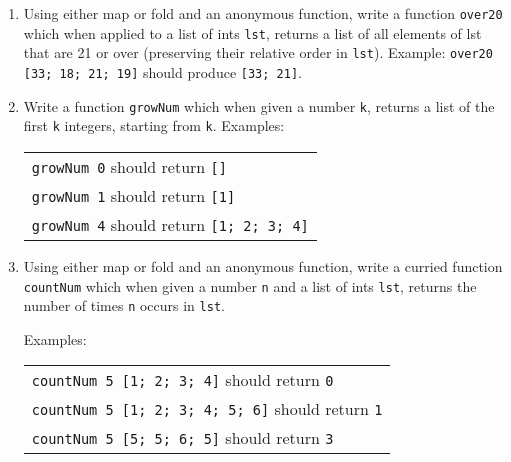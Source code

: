 \documentclass[11pt]{article}
\begin{document}
\begin{enumerate}
\begin{enumerate}
            \item Using either map or fold and an anonymous function, write
                  a function \texttt{over20} which when applied to a list of
                  ints \texttt{lst}, returns a list of all elements of lst
                  that are 21 or over (preserving their relative order in
                  \texttt{lst}).  Example: \texttt{over20 [33; 18; 21; 19]}
                  should produce \texttt{[33; 21]}.

            \item Write a function \texttt{growNum} which when given a
                  number \texttt{k}, returns a list of the first \texttt{k}
                  integers, starting from \texttt{k}.  Examples:

                  \begin{tabular}[t]{l}

                    \texttt{growNum 0} should return \texttt{[]}
                      \\

                    \texttt{growNum 1} should return \texttt{[1]}
                      \\

                    \texttt{growNum 4} should return \texttt{[1; 2; 3; 4]}
                      \\

                  \end{tabular}

            \item Using either map or fold and an anonymous function, write
                  a curried function \texttt{countNum} which when given a
                  number \texttt{n} and a list of ints \texttt{lst}, returns
                  the number of times \texttt{n} occurs in \texttt{lst}.

                  Examples:

                  \begin{tabular}[t]{l}

                    \texttt{countNum 5 [1; 2; 3; 4]} should return
                    \texttt{0}
                      \\

                    \texttt{countNum 5 [1; 2; 3; 4; 5; 6]} should return
                    \texttt{1}
                      \\

                    \texttt{countNum 5 [5; 5; 6; 5]} should return \texttt{3}
                      \\

                  \end{tabular}

          \end{enumerate}

          \vspace{-2.5mm}

  \end{enumerate}
\end{document}

